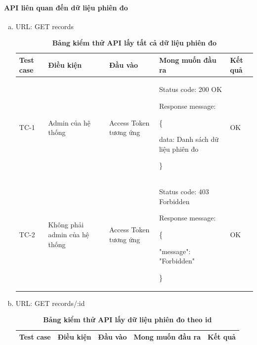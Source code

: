 \paragraph{API liên quan đến dữ liệu phiên đo}
\mbox{}

\begin{enumerate}[a)]
	\item URL: GET records
	      \begin{xltabular}{\textwidth}{
		      | >{\raggedright\arraybackslash}p{1cm}
		      | >{\raggedright\arraybackslash}p{2.5cm}
		      | >{\raggedright\arraybackslash}p{2.5cm}
		      | >{\raggedright\arraybackslash}X
		      | >{\raggedright\arraybackslash}p{1cm}|
		      }
		      \caption{\bfseries \fontsize{12pt}{0pt}\selectfont Bảng kiểm thử API lấy tất cả dữ liệu phiên đo}
		      \\
		      \hline
		      \bfseries Test case    &\bfseries Điều kiện   &\bfseries Đầu vào
		      &\bfseries Mong muốn đầu ra &\bfseries Kết quả\\ \hline


		      TC-1
		      & Admin của hệ thống
		      & Access Token tương ứng

		      &

		      Status code: 200 OK

		      Response message:

		      \{

		      data: Danh sách dữ liệu phiên đo

		      \}

		      & OK

		      \\ \hline

		      TC-2
		      & Không phải admin của hệ thống
		      & Access Token tương ứng

		      &

		      Status code: 403 Forbidden

		      Response message:

		      \{

		      "message": "Forbidden"

		      \}

		      & OK
		      \\ \hline


	      \end{xltabular}

	\item URL: GET records/{:id}
	      \begin{xltabular}{\textwidth}{
		      | >{\raggedright\arraybackslash}p{1cm}
		      | >{\raggedright\arraybackslash}p{2.5cm}
		      | >{\raggedright\arraybackslash}p{2.5cm}
		      | >{\raggedright\arraybackslash}X
		      | >{\raggedright\arraybackslash}p{1cm}|
		      }
		      \caption{\bfseries \fontsize{12pt}{0pt}\selectfont Bảng kiểm thử API lấy dữ liệu phiên đo theo id}
		      \\
		      \hline
		      \bfseries Test case    &\bfseries Điều kiện   &\bfseries Đầu vào
		      &\bfseries Mong muốn đầu ra &\bfseries Kết quả\\ \hline



\end{xltabular}
\end{enumerate}
